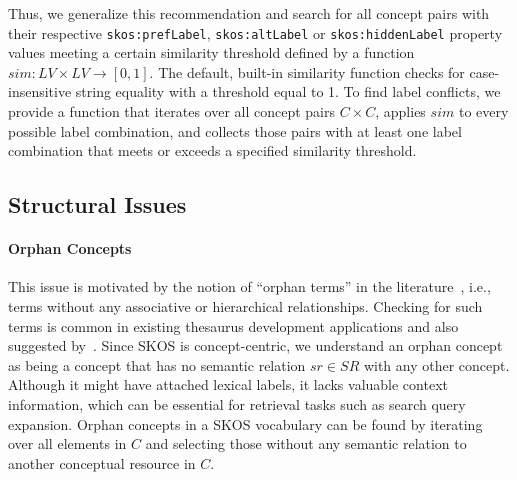 
Thus, we generalize this recommendation and search for all concept pairs with their respective \texttt{skos:prefLabel}, \texttt{skos:altLabel} or \texttt{skos:hiddenLabel} property values meeting a certain similarity threshold defined by a function $sim:LV \times LV \rightarrow [0,1]$. The default, built-in similarity function checks for case-insensitive string equality with a threshold equal to 1. To find label conflicts, we provide a function that iterates over all concept pairs $C \times C$, applies $sim$ to every possible label combination, and collects those pairs with at least one label combination that meets or exceeds a specified similarity threshold.


\subsection{Structural Issues}

\paragraph{Orphan Concepts}

This issue is motivated by the notion of ``orphan terms'' in the literature~\cite{Hedden2010}, i.e., terms without any associative or hierarchical relationships. Checking for such terms is common in existing thesaurus development applications and also suggested by~\cite{Z39.19:2005}. Since SKOS is concept-centric, we understand an orphan concept as being a concept that has no semantic relation $sr \in SR$ with any other concept. Although it might have attached lexical labels, it lacks valuable context information, which can be essential for retrieval tasks such as search query expansion.
Orphan concepts in a SKOS vocabulary can be found by iterating over all elements in $C$ and selecting those without any semantic relation to another conceptual resource in $C$.

